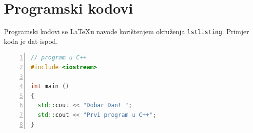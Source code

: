 \section{Programski kodovi}

Programski kodovi se \LaTeX u navode korištenjem okruženja {\tt lstlisting}. Primjer koda je dat ispod.

\begin{lstlisting}[frame=single,language=C++,numbers=left, numberstyle=\tiny, xleftmargin=0.05\textwidth, xrightmargin=0.05\textwidth, basicstyle=\ttfamily\footnotesize, caption=Primjer programa]
// program u C++
#include <iostream>

int main ()
{
  std::cout << "Dobar Dan! ";
  std::cout << "Prvi program u C++";
}
\end{lstlisting}
